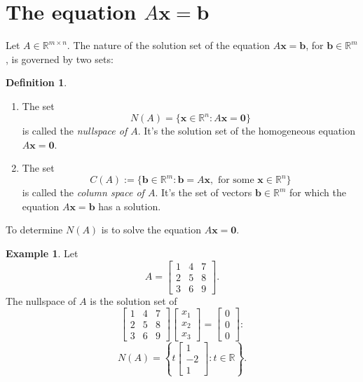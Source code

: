 \documentclass[12pt]{amsart}
\newcommand{\RR}{\mathbb{R}}
\theoremstyle{definition} \newtheorem{definition}[theorem]{Definition}
\newtheorem{example}[theorem]{Example}
\newcommand{\bb}{\mathbf{b}}
\newcommand{\bx}{\mathbf{x}}
\newcommand{\bzero}{\mathbf{0}}
\newcommand{\mat}[1]{\begin{bmatrix}#1\end{bmatrix}}
\newcommand{\setstuff}{\setlength{\parskip}{0.5em}\setlength{\parindent}{0em}\setlength{\itemsep}{0.5em}}
\begin{document}
\setstuff


\section{The equation $A\bx=\bb$}

Let $A\in\RR^{m\times n}$.
The nature of the solution set of the equation $A\bx=\bb$, for $\bb\in\RR^m$, is governed by two sets:

\begin{definition}\label{df:col_space}\hfill
  \begin{enumerate}\setstuff
    \item The set
    \[ N(A) = \{\bx\in\RR^n : A\bx=\bzero\} \]
      is called the \emph{nullspace of $A$}. It's the solution set of the homogeneous equation $A\bx=\bzero$.
   \item The set
     \[ C(A) := \{\bb\in\RR^m :	\bb=A\bx,\text{ for some }\bx\in\RR^n\} \]
    is called the \emph{column space of $A$}. It's the set of vectors $\bb\in\RR^m$ for which the equation $A\bx=\bb$ has a solution.
  \end{enumerate}
\end{definition}

To determine $N(A)$ is to solve the equation $A\bx=\bzero$.
\begin{example}\label{eg:nullspace}
  Let
  \[
    A = \mat{1&4&7\\2&5&8\\3&6&9}.
  \]
  The nullspace of $A$ is the solution set of
  \[
    \mat{1&4&7\\2&5&8\\3&6&9}\mat{x_1\\x_2\\x_3}=\mat{0\\0\\0}:
  \]
  \[
    N(A) =\left\{t\mat{1\\-2\\1} : t\in\RR\right\}.
  \]
\end{example}
\end{document}
